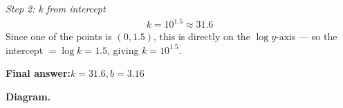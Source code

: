 \documentclass[11pt]{article}
\begin{document}
\textit{Step 2: k from intercept}
\[\begin{gathered}
k = 10^{1.5} \approx 31.6
\end{gathered}\]
Since one of the points is \( (0, 1.5) \), this is directly on the \( \log y \)-axis --- so the intercept \( = \log k = 1.5 \), giving \( k = 10^{1.5} \).

\begin{answerbox}
\textbf{Final answer:}\quad \(\displaystyle k = 31.6, b = 3.16\)
\end{answerbox}
\textbf{Diagram.}

\begin{center}
\end{center}
\end{document}
